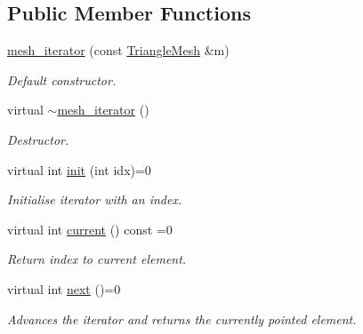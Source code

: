 \subsection*{Public Member Functions}
\begin{DoxyCompactItemize}
\item 
\hyperlink{classgeoproc_1_1iterators_1_1mesh__iterator_a785c3bccc57fd4db49de8aa89bc2d04e}{mesh\+\_\+iterator} (const \hyperlink{classgeoproc_1_1TriangleMesh}{Triangle\+Mesh} \&m)
\begin{DoxyCompactList}\small\item\em Default constructor. \end{DoxyCompactList}\item 
\mbox{\label{classgeoproc_1_1iterators_1_1mesh__iterator_a240e308565715a31d4e721736e7ef9a7}} 
virtual \hyperlink{classgeoproc_1_1iterators_1_1mesh__iterator_a240e308565715a31d4e721736e7ef9a7}{$\sim$mesh\+\_\+iterator} ()
\begin{DoxyCompactList}\small\item\em Destructor. \end{DoxyCompactList}\item 
\mbox{\label{classgeoproc_1_1iterators_1_1mesh__iterator_a8a4d8b5c84941dd0a7cb7373abcd3fcc}} 
virtual int \hyperlink{classgeoproc_1_1iterators_1_1mesh__iterator_a8a4d8b5c84941dd0a7cb7373abcd3fcc}{init} (int idx)=0
\begin{DoxyCompactList}\small\item\em Initialise iterator with an index. \end{DoxyCompactList}\item 
\mbox{\label{classgeoproc_1_1iterators_1_1mesh__iterator_ae6151b065602980d37a582977083ef42}} 
virtual int \hyperlink{classgeoproc_1_1iterators_1_1mesh__iterator_ae6151b065602980d37a582977083ef42}{current} () const =0
\begin{DoxyCompactList}\small\item\em Return index to current element. \end{DoxyCompactList}\item 
virtual int \hyperlink{classgeoproc_1_1iterators_1_1mesh__iterator_a32f1ddc2f83743a2b0a4633506601cfe}{next} ()=0
\begin{DoxyCompactList}\small\item\em Advances the iterator and returns the currently pointed element. \end{DoxyCompactList}\end{DoxyCompactItemize}

